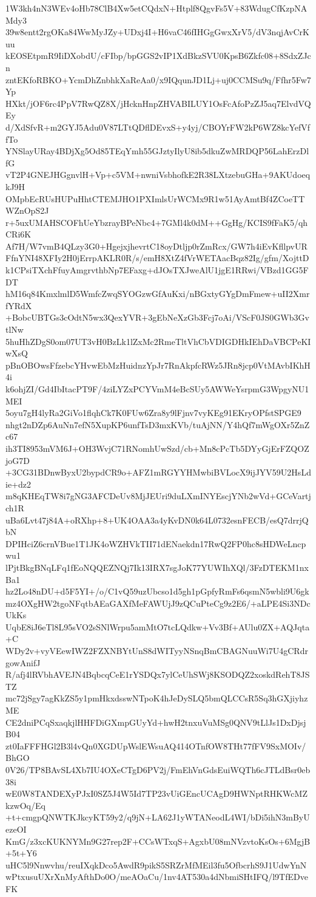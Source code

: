 1W3kh4nN3WEv4oHb78ClB4Xw5etCQdxN+Htplf8QgvFs5V+83WdugCfKzpNAMdy3
39w8entt2rgOKa84WwMyJZy+UDxj4I+H6vaC46fIHGgGwxXrV5/dV3nqjAvCrKuu
kEOSEtpmR9IiDXobdU/cFIbp/bpGGS2vIP1XdBkzSVU0KpsB6Zkfc08+8SdxZJcn
zntEKfoRBKO+YcmDhZnbhkXaReAa0/x9IQqunJD1Lj+uj0CCMSu9q/Ffhr5Fw7Yp
HXkt/jOF6rc4PpV7RwQZ8X/jHcknHnpZHVABILUY1OsFcAfoPzZJ5aq7ElvdVQEy
d/XdSfvR+m2GYJ5Adu0V87LTtQDflDEvxS+y4yj/CBOYrFW2kP6WZ8kcYefVffTo
YNSlayURay4BDjXg5Od85TEqYmh55GJztyIlyU8ib5dkuZwMRDQP56LahErzDlfG
vT2P4GNEJHGgnvlH+Vp+c5VM+nwniVsbhofkE2R38LXtzebuGHa+9AKUdoeqkJ9H
OMpbEcRUsHUPuHhtCTEMJHO1PXImlsUrWCMx9R1w51AyAmtBf4ZCoeTTWZnOpS2J
r+5uxUMAHSCOFhUeYbzrayBPeNbc4+7GMl4k0dM++GgHg/KCIS9fFaK5/qhCRi6K
Af7H/W7vmB4QLzy3G0+HgejxjhevrtC18oyDtljp0rZmRcx/GW7h4iEvKfllpvUR
FfnYNI48XFIy2H0jErrpAKLR0R/s/emH8XtZ4fVrWETAacBqz82Ig/gfm/XojttD
k1CPsiTXchFfuyAmgrvthbNp7EFaxg+dJOsTXJweAlU1jgE1RRwi/VBzd1GG5FDT
hM16q84KmxlmlD5WmfcZwqSYOGzwGfAuKxi/nBGxtyGYgDmFmew+uII2XmrfYRdX
+BobcUBTGs3cOdtN5wx3QexYVR+3gEbNeXzGb3Fcj7oAi/VScF0JS0GWb3GvtlNw
5huHhZDgS0om07UT3vH0BzLk1lZxMc2RmeTltVhCbVDIGDHkIEhDaVBCPeKIwXsQ
pBnOBOwsFfzebcYHvwEbMzHuidnzYpJr7RnAkpfcRWz5JRn8jcp0VtMAvbIKhH4i
k6ohjZI/Gd4IbItacPT9F/4ziLYZxPCYVmM4eBcSUy5AWWeYsrpmG3WpgyNU1MEI
5oyu7gH4lyRa2GiVo1flqhCk7K0FUw6Zra8y9lFjnv7vyKEg91EKryOPfstSPGE9
nhgt2nDZp6AuNn7efN5XupKP6unfTsD3mxKVb/tuAjNN/Y4hQf7mWgOXr5ZnZc67
ih3TI8953mVM6J+OH3WvjC71RNomhUwSzd/cb+Mn8cPcTb5DYyGjErFZQOZjoG7D
+3CG31BDnwByxU2bypdCR9o+AFZ1mRGYYHMwbiBVLocX9ijJYV59U2HsLdie+dz2
m8qKHEqTW8i7gNG3AFCDeUv8MjJEUri9duLXmINYEscjYNb2wVd+GCeVartjch1R
uBa6Lvt47j84A+oRXhp+8+UK4OAA3a4yKvDN0k64L0732esnFECB/esQ7drrjQbN
DPIHciZ6crnVBue1T1JK4oWZHVkTII71dENaekdn17RwQ2FP0hc8sHDWeLncpwu1
lPjtBkgBNqLFq1fEoNQQEZNQj7Ik13IRX7sgJoK77YUWIhXQl/3FzDTEKM1nxBa1
hz2Lo48nDU+d5F5YI+/o/C1vQ59uzUbcso1d5gh1pGpfyRmFs6qsmN5wbli9U6gk
mz4OXgHW2tgoNFqtbAEaGAXfMeFAWUjJ9zQCuPteCg9z2E6/+aLPE4Si3NDcUkKs
UqbE8iJ6eTl8L95sVO2sSNlWrpu5amMtO7tcLQdkw+Vv3Bf+AUlu0ZX+AQJqta+C
WDy2v+vyVEewIWZ2FZXNBYtUnS8dWITyyNSnqBmCBAGNuuWi7U4gCRdrgowAnifJ
R/afj4lRVbhAVEJN4BqbcqCeE1rYSDQx7ylCeUhSWj8KSODQZ2xoskdRehT8JSTZ
mc72jSgy7agKkZS5y1pmHkxdsswNTpoK4hJeDySLQ5bmQLCCsR5Sq3hGXjiyhzME
CE2dniPCqSxaqkjlHHFDiGXmpGUyYd+hwH2tnxuVuMSg0QNV9tLlJs1DxDjsjB04
zt0IaFFFHGl2B3l4vQn0XGDUpWslEWsuAQ414OTnfOW8THt77fFV9SxMOIv/BhGO
0V26/TP8BAvSL4Xb7IU4OXeCTgD6PV2j/FmEhVnGdsEuiWQTh6cJTLdBsr0eb38i
wE0W8TANDEXyPJxI0SZ5J4W5Id7TP23vUiGEncUCAgD9HWNptRHKWcMZkzwOq/Eq
+t+cmgpQNWTKJkcyKT59y2/q9jN+LA62J1yWTANeodL4WI/bDi5ihN3mByUezeOI
KmG/z3xcKUKNYMn9G27rep2F+CCsWTxqS+AgxbU08mNVzvtoKsOs+6MgjB+5t+Y6
uHC5l9Nnwvhu/reuIXqkDco5AwdR9pikS5SRZrMfMEil3fu5OfbcrhS9J1UdwYnN
wPtxusuUXrXnMyAfthDo0O/meAOaCu/1nv4AT530a4dNbmiSHtIFQ/l9TfEDveFK
